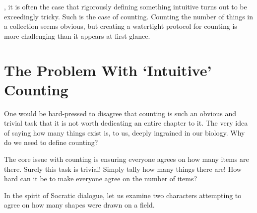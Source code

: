\makeatletter
{}
{
    \newcommand*{\personA}{\textsc{#1}:~}
    \newcommand*{\personB}{\textsc{#2}:~}

    \begin{itemize}[leftmargin=#3, rightmargin=#4, label={}]  %
}
{
    \end{itemize}
}
\makeatother

, it is often the case that rigorously defining something intuitive turns out to be exceedingly tricky. Such is the case of counting. Counting the number of things in a collection seems obvious, but creating a watertight protocol for counting is more challenging than it appears at first glance.

\section{The Problem With `Intuitive' Counting}
One would be hard-pressed to disagree that counting is such an obvious and trivial task that it is not worth dedicating an entire chapter to it. The very idea of saying how many things exist is, to us, deeply ingrained in our biology. Why do we need to define counting?

The core issue with counting is ensuring everyone agrees on how many items are there. Surely this task is trivial! Simply tally how many things there are! How hard can it be to make everyone agree on the number of items?

In the spirit of Socratic dialogue, let us examine two characters attempting to agree on how many shapes were drawn on a field.

